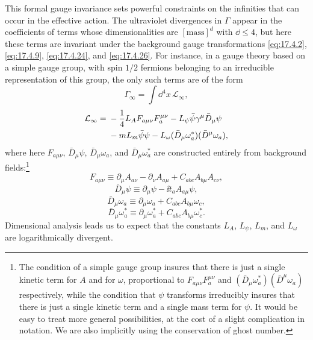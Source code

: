 This formal gauge invariance sets powerful constraints on the infinities
that can occur in the effective action. The ultraviolet divergences in
$\Gamma$ appear in the coefficients of terms whose dimensionalities are
$[\mathrm{mass}]^d$ with $\dd\leq4$, but here these terms are invariant under
the background gauge transformations \eqref{eq:17.4.2},
\eqref{eq:17.4.9}, \eqref{eq:17.4.24}, and \eqref{eq:17.4.26}. For
instance, in a gauge theory based on a simple gauge group, with spin $1/2$
fermions belonging to an irreducible representation of this group, the only
such terms are of the form
\begin{equation}
\Gamma_\infty=\int \dd^4x\,\mathcal L_\infty,
\label{eq:17.4.29}
\end{equation}
\begin{align}
\mathcal L_\infty={}&-\frac14L_A F_{a\mu\nu}F_a^{\mu\nu}
-L_\psi\bar\psi\gamma^\mu\bar D_\mu\psi \notag\\
&-mL_m\bar\psi\psi
-L_\omega(\bar D_\mu\omega_a^*)(\bar D^\mu\omega_a),
\label{eq:17.4.30}
\end{align}
where here $F_{a\mu\nu}$, $\bar D_\mu\psi$,
$\bar D_\mu\omega_a$, and $\bar D_\mu\omega_a^*$ are constructed
entirely from background fields:\footnote{The condition of a simple gauge group insures that there is just a single kinetic term for $A$ and for $\omega$, proportional to $F_{a\mu\nu}F_a^{\mu\nu}$ and $(\bar D_\mu\omega_a^*)(\bar D^\mu\omega_a)$ respectively, while the condition that $\psi$ transforms irreducibly insures that there is just a single kinetic term and a single mass term for $\psi$. It would be easy to treat more general possibilities, at the cost of a slight complication in notation. We are also implicitly using the conservation of ghost number.}
\begin{equation}
F_{a\mu\nu}\equiv
\partial_\mu A_{a\nu}-\partial_\nu A_{a\mu}
+C_{abc}A_{b\mu}A_{c\nu},
\label{eq:17.4.31}
\end{equation}
\begin{equation}
\bar D_\mu\psi\equiv\partial_\mu\psi-\ii t_a A_{a\mu}\psi,
\label{eq:17.4.32}
\end{equation}
\begin{equation}
\bar D_\mu\omega_a\equiv
\partial_\mu\omega_a
+C_{abc}A_{b\mu}\omega_c,
\label{eq:17.4.33}
\end{equation}
\begin{equation}
\bar D_\mu\omega_a^*\equiv
\partial_\mu\omega_a^*
+C_{abc}A_{b\mu}\omega_c^*.
\label{eq:17.4.34}
\end{equation}
Dimensional analysis leads us to expect that the constants $L_A$, $L_\psi$,
$L_m$, and $L_\omega$ are logarithmically divergent.

